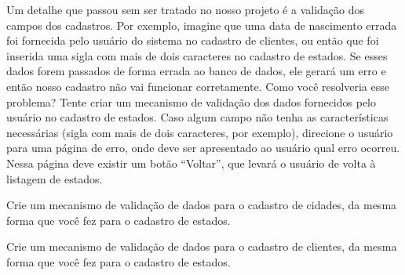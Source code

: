 \begin{projetoSemArquivo}{}{}{}
    Um detalhe que passou sem ser tratado no nosso projeto é a validação dos campos dos cadastros. Por exemplo, imagine que uma data de nascimento errada foi fornecida pelo usuário do sistema no cadastro de clientes, ou então que foi inserida uma sigla com mais de dois caracteres no cadastro de estados. Se esses dados forem passados de forma errada ao banco de dados, ele gerará um erro e então nosso cadastro não vai funcionar corretamente. Como você resolveria esse problema? Tente criar um mecanismo de validação dos dados fornecidos pelo usuário no cadastro de estados. Caso algum campo não tenha as características necessárias (sigla com mais de dois caracteres, por exemplo), direcione o usuário para uma página de erro, onde deve ser apresentado ao usuário qual erro ocorreu. Nessa página deve existir um botão ``Voltar'', que levará o usuário de volta à listagem de estados.
\end{projetoSemArquivo}

\begin{projetoSemArquivo}{}{}{}
    Crie um mecanismo de validação de dados para o cadastro de cidades, da mesma forma que você fez para o cadastro de estados.
\end{projetoSemArquivo}

\begin{projetoSemArquivo}{}{}{}
    Crie um mecanismo de validação de dados para o cadastro de clientes, da mesma forma que você fez para o cadastro de estados.
\end{projetoSemArquivo}